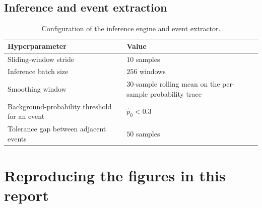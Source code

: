 \subsection{Inference and event extraction}
\label{app:hp-inf}

\begin{table}[H]
    \centering
    \footnotesize
    \begin{tabular}{ll}
        \toprule
        Hyperparameter & Value \\
        \midrule
        Sliding-window stride & $10$ samples \\
        Inference batch size  & $256$ windows \\
        Smoothing window      & $30$-sample rolling mean on the per-sample probability trace \\
        Background-probability threshold for an event & $\hat{p}_0 < 0.3$ \\
        Tolerance gap between adjacent events & $50$ samples \\
        \bottomrule
    \end{tabular}
    \caption{Configuration of the inference engine and event extractor.}
    \label{tab:inf-config}
\end{table}

\section{Reproducing the figures in this report}
\label{app:reproduce}

